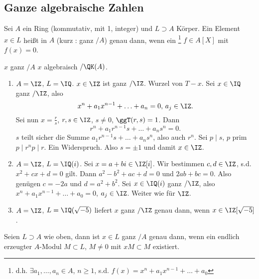 
\renewcommand{\lecdate}{28.10.14}

\subsection{Ganze algebraische Zahlen}

\begin{Definition}
 Sei $A$ ein Ring (kommutativ, mit 1, integer) und $L\supset A$ Körper. Ein Element $x\in L$ heißt  in $A$ (kurz : ganz $/A$) genau dann, wenn ein \footnote{d.h. $\exists a_1,\ldots,a_n\in A$, $n\geq 1$, s.d. $f(x)=x^n+a_1x^{n-1}+\ldots+a_0$} $f\in A[X]$ mit $f(x)=0$. 
\end{Definition}

\begin{Bemerkung}
 $x$ ganz $/A$ \folge $x$ algebraisch $/\QK(A)$.
\end{Bemerkung}

\begin{Beispiel}
 \begin{enumerate}
  \item $A=\IZ$, $L=\IQ$. $x\in\IZ$ ist ganz $/\IZ$. Wurzel von $T-x$. Sei $x\in\IQ$ ganz $/\IZ$, also
  \[x^n+a_1x^{n-1}+\ldots +a_n=0,\, a_j\in\IZ.\]
  Sei nun $x=\frac{r}{s}$, $r,s\in\IZ$, $s\neq 0$, $\ggT(r,s)=1$. Dann
  \[ r^n+a_1r^{n-1}s+\ldots+a_ns^n=0.\]
  $s$ teilt sicher die Summe $a_1r^{n-1}s+\ldots+a_ns^n$, also auch $r^n$. Sei $p\mid s$, $p$ prim \folge $p\mid r^n$\folge $p\mid r$. Ein Widerspruch. Also $s=\pm 1$ und damit $x\in\IZ$.
  \item $A=\IZ$, $L=\IQ(i)$. Sei $x=a+bi\in\IZ[i]$. Wir bestimmen $c,d\in\IZ$, s.d. $x^2+cx+d=0$ gilt.
  Dann $a^2-b^2+ac+d=0$ und $2ab+bc=0$. Also genügen $c=-2a$ und $d=a^2+b^2$.
  Sei $x\in\IQ(i)$ ganz $/\IZ$, also $x^n+a_1x^{n-1}+\ldots+a_0=0$, $a_j\in\IZ$. Weiter wie für $\IZ$.
  \item $A=\IZ$, $L=\IQ(\sqrt{-5})$ liefert $x$ ganz $/\IZ$ genau dann, wenn $x\in\IZ[\sqrt{-5}]$.
 \end{enumerate}
\end{Beispiel}

\begin{Fakt}
 Seien $L\supset A$ wie oben, dann ist $x\in L$ ganz $/A$ genau dann, wenn ein endlich erzeugter $A$-Modul $M\subset L$, $M\neq 0$ mit $xM\subset M$ existiert.
\end{Fakt}

